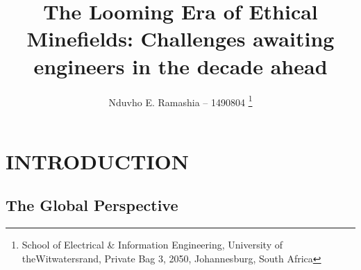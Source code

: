 \documentclass[12pt]{witseiepaper}
\begin{document}
\title{The Looming Era of Ethical Minefields: Challenges awaiting engineers in the decade ahead}

\author{Nduvho E. Ramashia -- 1490804 
\thanks{School of Electrical \& Information Engineering, University of theWitwatersrand, Private Bag 3, 2050, Johannesburg, South Africa} 
} 




\maketitle
\thispagestyle{empty}
\pagestyle{empty}


\section{INTRODUCTION} 

    \subsection{The Global Perspective} 
\end{document}

